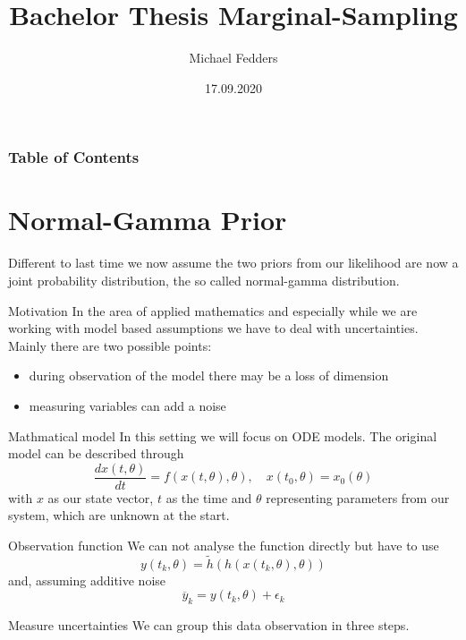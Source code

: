 \documentclass{beamer}
\title{Bachelor Thesis Marginal-Sampling}
\date{17.09.2020}
\author{Michael Fedders}
\begin{document}
	\maketitle
  	\begin{frame}[plain]
		\frametitle{Table of Contents}
		\tableofcontents
	\end{frame}
	
\section{Normal-Gamma Prior}

	\begin{frame}
		Different to last time we now assume the two priors from our likelihood are now a joint probability distribution, the so called normal-gamma distribution.			
	\end{frame}

  	\begin{frame}{Motivation}
	  	In the area of applied mathematics and especially while we are working
	  	with model based assumptions we have to deal with uncertainties. Mainly
	  	there are two possible points:
	  	\begin{itemize}
	  		\item during observation of the model there may be a \alert{loss} of 
	  		dimension
	  		\item measuring variables can add a \alert{noise}
	  	\end{itemize}
	\end{frame}
  
  	\begin{frame}{Mathmatical model}
     	In this setting we will focus on ODE models. The original model can be described
     	through
     	\[
     	\frac{dx(t,\theta)}{dt} = f(x(t,\theta),\theta), \quad x(t_0,\theta) = 
     	x_0(\theta)
     	\]
     	with $x$ as our state vector, $t$ as the time and $\theta$ representing
     	parameters from our system, which are unknown at the start.
	\end{frame}
	
	\begin{frame}{Observation function}
  		We can not analyse the function directly but have to use
		\[
			y(t_k,\theta) = \tilde{h}(h(x(t_k,\theta),\theta))
		\]
		and, assuming additive noise
		\[
			\overline{y}_{k} = y(t_k,\theta) + \epsilon_{k}
		\]
	\end{frame}
	
	
  	\begin{frame}{Measure uncertainties}
    	We can group this data observation in three steps.      	
  	\end{frame}
  	
\end{document}
